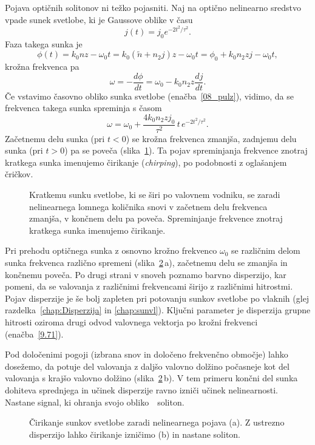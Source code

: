 Pojava optičnih solitonov ni težko pojasniti. Naj na optično nelinearno sredstvo
vpade sunek svetlobe, ki je Gaussove oblike v času
\begin{equation}
j(t) = j_0 e^{-2t^2/\tau^2}.
\label{08_pulz}
\end{equation}
Faza takega sunka je 
\begin{equation}
\phi (t) = k_0 n z - \omega_0 t = k_0 (\tilde{n} + n_2 j)z - \omega_0 t = 
\phi_0 + k_0 n_2 z j - \omega_0 t,
\end{equation}
krožna frekvenca pa 
\begin{equation}
\omega = -\frac{d\phi}{dt} = \omega_0 - k_0 n_2 z \frac{dj}{dt}.
\end{equation}
Če vstavimo časovno obliko sunka svetlobe (enačba~\ref{08_pulz}), vidimo, da se 
frekvenca takega sunka spreminja s časom
\begin{equation}
\omega = \omega_0 + \frac{4k_0 n_2 z j_0}{\tau^2} \, t \, e^{-2t^2/\tau^2}.
\label{eq:chirpi}
\end{equation}
Začetnemu delu sunka (pri $t<0$) se krožna frekvenca zmanjša, zadnjemu delu sunka
(pri $t>0$) pa se poveča (slika~\ref{fig:optsoliton}). 
Ta pojav spreminjanja frekvence znotraj kratkega sunka imenujemo čirikanje
({\it chirping}),  po podobnosti z oglašanjem čričkov.

\begin{figure}[h]
\centering
\def\svgwidth{70truemm} 

\caption{Kratkemu sunku svetlobe, ki se širi po valovnem vodniku, se zaradi nelinearnega 
lomnega količnika snovi v začetnem delu frekvenca zmanjša, v končnem delu pa poveča.
Spreminjanje frekvence znotraj kratkega sunka imenujemo čirikanje.}
\label{fig:optsoliton}
\end{figure}
Pri prehodu optičnega sunka z osnovno krožno frekvenco $\omega_0$ se različnim delom sunka
frekvenca različno spremeni (slika~\ref{fig:chirp}\,a), začetnemu delu se zmanjša in 
končnemu poveča. Po drugi strani v snoveh poznamo barvno disperzijo, 
kar pomeni, da se valovanja z različnimi frekvencami širijo z različnimi hitrostmi.
 Pojav disperzije je še bolj zapleten pri potovanju sunkov svetlobe po vlaknih
(glej razdelka~\ref{chap:Disperzija} in \ref{chap:sunvl}). Ključni parameter je disperzija 
grupne hitrosti oziroma drugi odvod valovnega vektorja po krožni frekvenci (enačba~\ref{9.71}).

Pod določenimi pogoji (izbrana snov in določeno frekvenčno območje) 
lahko dosežemo, da potuje del valovanja z daljšo valovno dolžino počasneje kot del valovanja
s krajšo valovno dolžino (slika~\ref{fig:chirp}\,b). V tem primeru končni del sunka 
dohiteva sprednjega in učinek disperzije ravno izniči učinek nelinearnosti. 
Nastane signal, ki ohranja svojo obliko~\textendash~soliton. 
\begin{figure}[h]
\centering
\def\svgwidth{145truemm} 

\caption{Čirikanje sunkov svetlobe zaradi nelinearnega pojava (a). Z ustrezno disperzijo lahko
čirikanje izničimo (b) in nastane soliton.}
\label{fig:chirp}
\end{figure}

